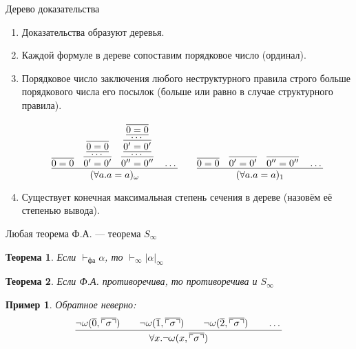 \documentclass[aspectratio=169]{beamer}
\newtheorem{thm}{Теорема}[section]
\newtheorem{exm}{Пример}[section]
\begin{document}
\begin{frame}{Дерево доказательства}
\begin{enumerate}
\item Доказательства образуют деревья.
\item Каждой формуле в дереве сопоставим порядковое число (ординал).
\item Порядковое число заключения любого неструктурного правила строго больше порядкового числа его посылок
(больше или равно в случае структурного правила).

$$\infer{(\forall a.a = a)_\omega}{
   \infer{0 = 0}{}\quad
   \infer{0'= 0'}{\infer{\dots}{\infer{0= 0}{}}}\quad
   \infer{0''= 0''}{\infer{\dots}{\infer{0'= 0'}{\infer{\dots}{\infer{0= 0}{}}}}}\quad\dots
}\quad\quad\infer{(\forall a.a = a)_1}{
   \infer{0 = 0}{}\quad
   \infer{0'= 0'}{}\quad
   \infer{0''= 0''}{}\quad\dots
}$$

                 
\item Существует конечная максимальная степень сечения в дереве (назовём её степенью вывода).
\end{enumerate}
\end{frame}

\begin{frame}{Любая теорема Ф.А. --- теорема $S_\infty$}
\begin{thm}Если $\vdash_\text{фа}\alpha$, то $\vdash_\infty|\alpha|_\infty$ \end{thm}
\begin{thm}Если Ф.А. противоречива, то противоречива и $S_\infty$\end{thm}
\begin{exm}Обратное неверно: $$\infer{\forall x.\neg\omega(x,\overline{\ulcorner\sigma\urcorner})}
{\neg\omega(\overline{0},\overline{\ulcorner\sigma\urcorner})\quad\quad
 \neg\omega(\overline{1},\overline{\ulcorner\sigma\urcorner})\quad\quad
 \neg\omega(\overline{2},\overline{\ulcorner\sigma\urcorner})\quad\quad\dots}$$
\end{exm}
\end{frame}
\end{document}
